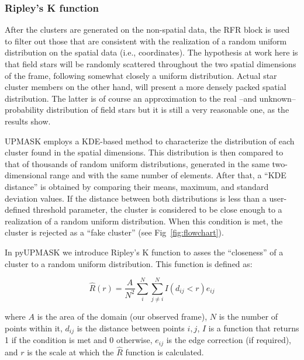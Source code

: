 \documentclass[draft]{aa}
\begin{document}
\subsubsection{Ripley's K function}
 \label{sssec:ripley}

 After the clusters are generated on the non-spatial data, the RFR block is
 used to filter out those that are consistent with the realization of a random
 uniform distribution on the spatial data (i.e., coordinates). The hypothesis
 at work here is that field stars will be randomly scattered throughout the
 two spatial dimensions of the frame, following somewhat closely a uniform
 distribution. Actual star cluster members on the other hand, will present a
 more densely packed spatial distribution.
 The latter is of course an approximation to the real --and unknown--
 probability distribution of field stars but it is still a very reasonable
 one, as the results show.

 UPMASK employs a KDE-based method to characterize the distribution of each
 cluster found in the spatial dimensions. This distribution is then compared
 to that of thousands of random uniform distributions, generated in the same
 two-dimensional range and with the same number of elements. After that,
 a ``KDE distance'' is obtained by comparing their means, maximum, and
 standard deviation values.
 If the distance between both distributions is less than a user-defined
 threshold parameter, the cluster is considered to be close enough to a
 realization of a random uniform distribution. When this condition is met, the
 cluster is rejected as a ``fake cluster'' (see Fig~\ref{fig:flowchart}).

 In pyUPMASK we introduce Ripley's K function \citep{ripley_1976,ripley_1979}
 to asses the ``closeness'' of a cluster to a random uniform distribution. This
 function is defined as:

 \begin{equation}
 \hat{R}(r) = \frac{A}{N^2} \sum_i^N \sum_{j\neq i}^N I(d_{ij} < r) e_{ij}
 \end{equation}

 \noindent where $A$ is the area of the domain (our observed frame), $N$ is
 the number of points within it, $d_{ij}$ is the distance between points
 $i,j$, $I$ is a function that returns 1 if the condition is met and 0
 otherwise, $e_{ij}$ is the edge correction (if required), and $r$ is the
 scale at which the $ \hat{R}$ function is calculated.
\end{document}
